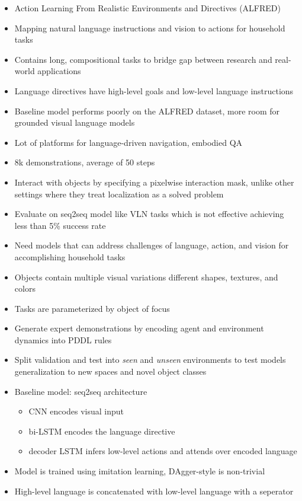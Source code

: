 \begin{itemize}
  \item Action Learning From Realistic Environments and Directives (ALFRED)
  \item Mapping natural language instructions and vision to actions for household tasks
  \item Contains long, compositional tasks to bridge gap between research and real-world applications
  \item Language directives have high-level goals and low-level language instructions
  \item Baseline model performs poorly on the ALFRED dataset, more room for grounded visual language models
  \item Lot of platforms for language-driven navigation, embodied QA
  \item 8k demonstrations, average of 50 steps
  \item Interact with objects by specifying a pixelwise interaction mask, unlike other settings where they treat localization as a solved problem
  \item Evaluate on seq2seq model like VLN tasks which is not effective achieving less than 5\% success rate
  \item Need models that can address challenges of language, action, and vision for accomplishing household tasks
  \item Objects contain multiple visual variations different shapes, textures, and colors
  \item Tasks are parameterized by object of focus
  \item Generate expert demonstrations by encoding agent and environment dynamics into PDDL rules
  \item Split validation and test into \textit{seen} and \textit{unseen} environments to test models generalization to new spaces and novel object classes
  \item Baseline model: seq2seq architecture
  \begin{itemize}
    \item CNN encodes visual input
    \item bi-LSTM encodes the language directive
    \item decoder LSTM infers low-level actions and attends over encoded language
  \end{itemize}
  \item Model is trained using imitation learning, DAgger-style is non-trivial
  \item High-level language is concatenated with low-level language with a seperator

\end{itemize}
